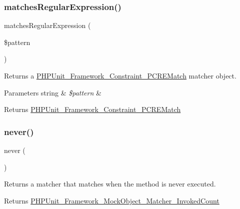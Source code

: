 \subsubsection{\texorpdfstring{matches\+Regular\+Expression()}{matchesRegularExpression()}}
{\footnotesize\ttfamily matches\+Regular\+Expression (\begin{DoxyParamCaption}\item[{}]{\$pattern }\end{DoxyParamCaption})}

Returns a \mbox{\hyperlink{class_p_h_p_unit___framework___constraint___p_c_r_e_match}{P\+H\+P\+Unit\+\_\+\+Framework\+\_\+\+Constraint\+\_\+\+P\+C\+R\+E\+Match}} matcher object.


\begin{DoxyParams}[1]{Parameters}
string & {\em \$pattern} & \\
\hline
\end{DoxyParams}
\begin{DoxyReturn}{Returns}
\mbox{\hyperlink{class_p_h_p_unit___framework___constraint___p_c_r_e_match}{P\+H\+P\+Unit\+\_\+\+Framework\+\_\+\+Constraint\+\_\+\+P\+C\+R\+E\+Match}} 
\end{DoxyReturn}
\mbox{\label{_functions_8php_a5f3c11b90fed1f1f1cd123af8f802285}} 
\subsubsection{\texorpdfstring{never()}{never()}}
{\footnotesize\ttfamily never (\begin{DoxyParamCaption}{ }\end{DoxyParamCaption})}

Returns a matcher that matches when the method is never executed.

\begin{DoxyReturn}{Returns}
\mbox{\hyperlink{class_p_h_p_unit___framework___mock_object___matcher___invoked_count}{P\+H\+P\+Unit\+\_\+\+Framework\+\_\+\+Mock\+Object\+\_\+\+Matcher\+\_\+\+Invoked\+Count}} 
\end{DoxyReturn}
\mbox{\label{_functions_8php_aa56578de5940440fff547d12ef8c708c}} 

